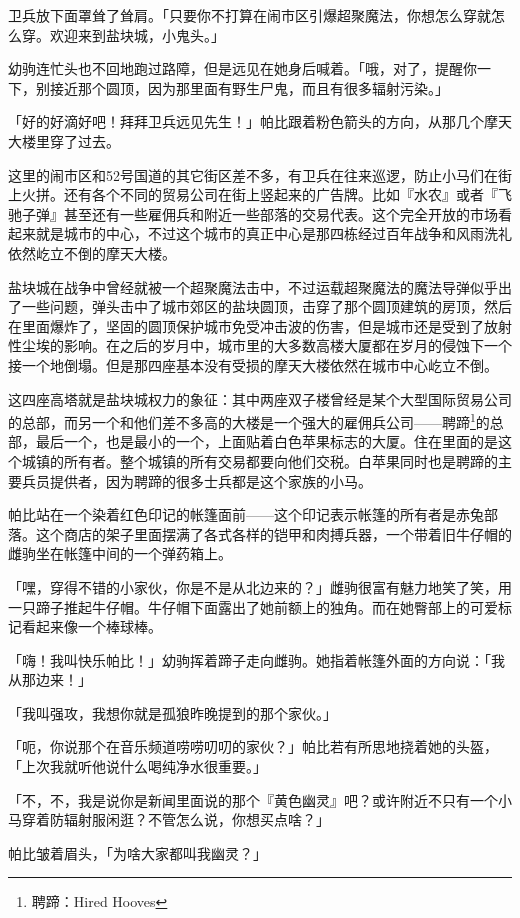 卫兵放下面罩耸了耸肩。「只要你不打算在闹市区引爆超聚魔法，你想怎么穿就怎么穿。欢迎来到盐块城，小鬼头。」

幼驹连忙头也不回地跑过路障，但是远见在她身后喊着。「哦，对了，提醒你一下，别接近那个圆顶，因为那里面有野生尸鬼，而且有很多辐射污染。」

「好的好滴好吧！拜拜卫兵远见先生！」帕比跟着粉色箭头的方向，从那几个摩天大楼里穿了过去。

这里的闹市区和52号国道的其它街区差不多，有卫兵在往来巡逻，防止小马们在街上火拼。还有各个不同的贸易公司在街上竖起来的广告牌。比如『水农』或者『飞驰子弹』甚至还有一些雇佣兵和附近一些部落的交易代表。这个完全开放的市场看起来就是城市的中心，不过这个城市的真正中心是那四栋经过百年战争和风雨洗礼依然屹立不倒的摩天大楼。

盐块城在战争中曾经就被一个超聚魔法击中，不过运载超聚魔法的魔法导弹似乎出了一些问题，弹头击中了城市郊区的盐块圆顶，击穿了那个圆顶建筑的房顶，然后在里面爆炸了，坚固的圆顶保护城市免受冲击波的伤害，但是城市还是受到了放射性尘埃的影响。在之后的岁月中，城市里的大多数高楼大厦都在岁月的侵蚀下一个接一个地倒塌。但是那四座基本没有受损的摩天大楼依然在城市中心屹立不倒。

这四座高塔就是盐块城权力的象征：其中两座双子楼曾经是某个大型国际贸易公司的总部，而另一个和他们差不多高的大楼是一个强大的雇佣兵公司——聘蹄\footnote{聘蹄：Hired Hooves}的总部，最后一个，也是最小的一个，上面贴着白色苹果标志的大厦。住在里面的是这个城镇的所有者。整个城镇的所有交易都要向他们交税。白苹果同时也是聘蹄的主要兵员提供者，因为聘蹄的很多士兵都是这个家族的小马。

帕比站在一个染着红色印记的帐篷面前——这个印记表示帐篷的所有者是赤兔部落。这个商店的架子里面摆满了各式各样的铠甲和肉搏兵器，一个带着旧牛仔帽的雌驹坐在帐篷中间的一个弹药箱上。

「嘿，穿得不错的小家伙，你是不是从北边来的？」雌驹很富有魅力地笑了笑，用一只蹄子推起牛仔帽。牛仔帽下面露出了她前额上的独角。而在她臀部上的可爱标记看起来像一个棒球棒。

「嗨！我叫快乐帕比！」幼驹挥着蹄子走向雌驹。她指着帐篷外面的方向说：「我从那边来！」

「我叫强攻，我想你就是孤狼昨晚提到的那个家伙。」

「呃，你说那个在音乐频道唠唠叨叨的家伙？」帕比若有所思地挠着她的头盔，「上次我就听他说什么喝纯净水很重要。」

「不，不，我是说你是新闻里面说的那个『黄色幽灵』吧？或许附近不只有一个小马穿着防辐射服闲逛？不管怎么说，你想买点啥？」

帕比皱着眉头，「为啥大家都叫我幽灵？」

